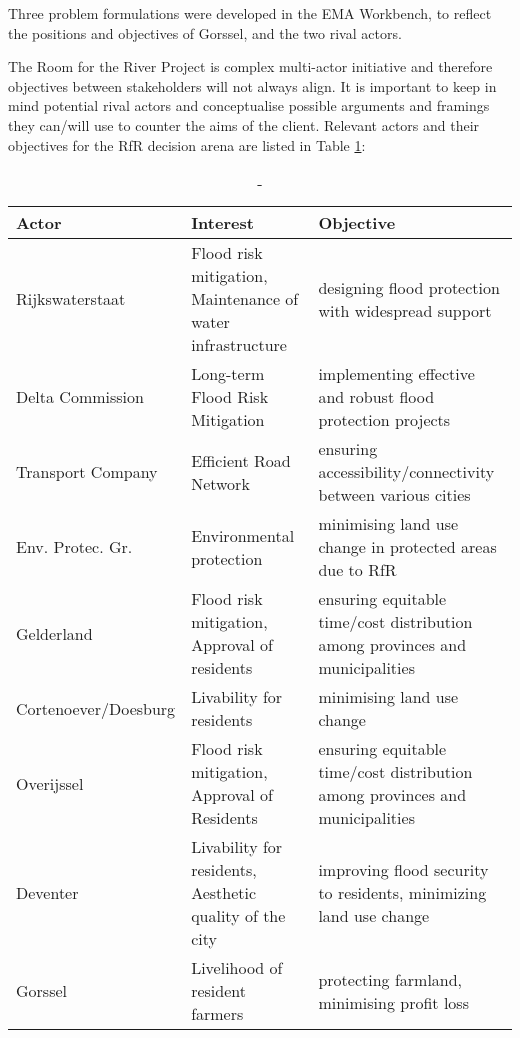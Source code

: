 
Three problem formulations were developed in the EMA Workbench, to reflect the positions and objectives of Gorssel, and the two rival actors.

The Room for the River Project is complex multi-actor initiative and therefore objectives between stakeholders will not always align. It is important to keep in mind potential rival actors and conceptualise possible arguments and framings they can/will use to counter the aims of the client. Relevant actors and their objectives for the RfR decision arena are listed in Table \ref{t:actortable}:

\begin{table}[h!]
\begin{tabular}{p{}p{}p{}}
\hline 
Actor & Interest & Objective \\ \hline
Rijkswaterstaat         & Flood risk mitigation, Maintenance of water infrastructure & designing flood protection with widespread support \\ 
Delta Commission        & Long-term Flood Risk Mitigation & implementing effective and robust flood protection projects \\
Transport Company       & Efficient Road Network & ensuring accessibility/connectivity between various cities \\
Env. Protec. Gr.        & Environmental protection & minimising land use change in protected areas due to RfR \\
Gelderland              & Flood risk mitigation, Approval of residents & ensuring equitable time/cost distribution among provinces and municipalities \\
Cortenoever/Doesburg    & Livability for residents & minimising land use change \\
Overijssel              & Flood risk mitigation, Approval of Residents & ensuring equitable time/cost distribution among provinces and municipalities \\
Deventer                & Livability for residents, Aesthetic quality of the city & improving flood security to residents, minimizing land use change \\
Gorssel                & Livelihood of resident farmers & protecting farmland, minimising profit loss \\
\end{tabular}
\caption{-}
\label{t:actortable}
\end{table}

